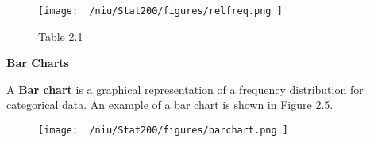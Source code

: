 \documentclass{report}
\begin{document}
\begin{figure}[ht]
\centering
\texttt{[image:  ~/niu/Stat200/figures/relfreq.png ]}
\caption{Table 2.1}
\end{figure}

\bigbreak \noindent \bigbreak \noindent

\begin{large}
 \noindent \textbf{Bar Charts} 
\end{large}
\bigbreak \noindent
A \textbf{\underline{Bar chart}} is a graphical representation of a frequency distribution for categorical data. An example of a bar chart is shown in \underline{Figure 2.5}.
\bigbreak \noindent 
\begin{figure}[ht]
\centering
\texttt{[image:  ~/niu/Stat200/figures/barchart.png ]}
\end{figure}
\end{document}
